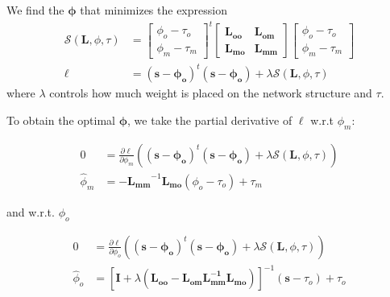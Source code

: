         We find the $\mathbf{\phi}$ that minimizes the expression
        \begin{align}
            \mathcal{S}(\mathbf{L}, \phi, \tau) &= 
                \begin{bmatrix}
                    \phi_o - \tau_o \\ \phi_m - \tau_m
                \end{bmatrix}^t
                \begin{bmatrix}
                    \mathbf{L_{oo}} & \mathbf{L_{om}} \\ \mathbf{L_{mo}} & \mathbf{L_{mm}}
                \end{bmatrix}
                \begin{bmatrix}
                    \phi_o - \tau_o \\ \phi_m - \tau_m
                \end{bmatrix} \\
            \ell &= (\mathbf{s} - \mathbf{\phi_o})^t(\mathbf{s} - \mathbf{\phi_o}) + \lambda
                \mathcal{S}(\mathbf{L}, \phi, \tau) \label{eqn:laplacian_regularization_objective_function}
        \end{align}
        \noindent where $\lambda$ controls how much weight is
        placed on the network structure and $\tau$.

        To obtain the optimal $\mathbf{\phi}$, we take the partial
        derivative of $\ell$ w.r.t $\phi_m$:

        \begin{align}
            0 &= \frac{\partial\ell}{\partial\phi_m}\left((\mathbf{s} - \mathbf{\phi_o})^t(\mathbf{s} - \mathbf{\phi_o}) + \lambda
                \mathcal{S}(\mathbf{L}, \phi, \tau)\right)\\
            {\hat \phi_m} &= -\mathbf{L_{mm}}^{-1}\mathbf{L_{mo}}(\phi_o - \tau_o) + \tau_m
            \label{eqn:estimate_of_phi_m}
        \end{align}

        \noindent and w.r.t. $\phi_o$

        \begin{align}
            0 &= \frac{\partial\ell}{\partial\phi_o}\left((\mathbf{s} - \mathbf{\phi_o}
                )^t(\mathbf{s} - \mathbf{\phi_o}) + \lambda
                \mathcal{S}(\mathbf{L}, \phi, \tau)\right)\\
            {\hat \phi_o} &= \left[
                \mathbf{I} + \lambda\left(\mathbf{L_{oo}} -
                    \mathbf{L_{om}}\mathbf{L_{mm}^{-1}}\mathbf{L_{mo}}
                \right)
            \right]^{-1}(\mathbf{s} - \tau_o) + \tau_o
            \label{eqn:estimate_of_phi_o}
        \end{align}

